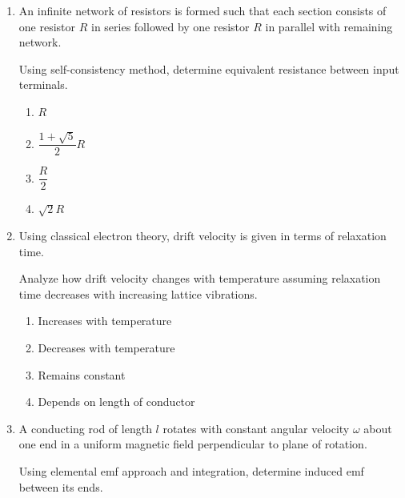 \documentclass[12pt]{article}
\begin{document}
\begin{enumerate}
\item An infinite network of resistors is formed such that each section consists of one resistor $R$ in series followed by one resistor $R$ in parallel with remaining network.

Using self-consistency method, determine equivalent resistance between input terminals.

\begin{enumerate}[label=\Alph*)]
\item $R$
\item $\dfrac{1+\sqrt{5}}{2}R$
\item $\dfrac{R}{2}$
\item $\sqrt{2}R$
\end{enumerate}

\item Using classical electron theory, drift velocity is given in terms of relaxation time.

Analyze how drift velocity changes with temperature assuming relaxation time decreases with increasing lattice vibrations.

\begin{enumerate}[label=\Alph*)]
\item Increases with temperature
\item Decreases with temperature
\item Remains constant
\item Depends on length of conductor
\end{enumerate}


\item A conducting rod of length $l$ rotates with constant angular velocity $\omega$ about one end in a uniform magnetic field perpendicular to plane of rotation.

Using elemental emf approach and integration, determine induced emf between its ends.

\begin{center}
\end{center}
\end{enumerate}
\end{document}
